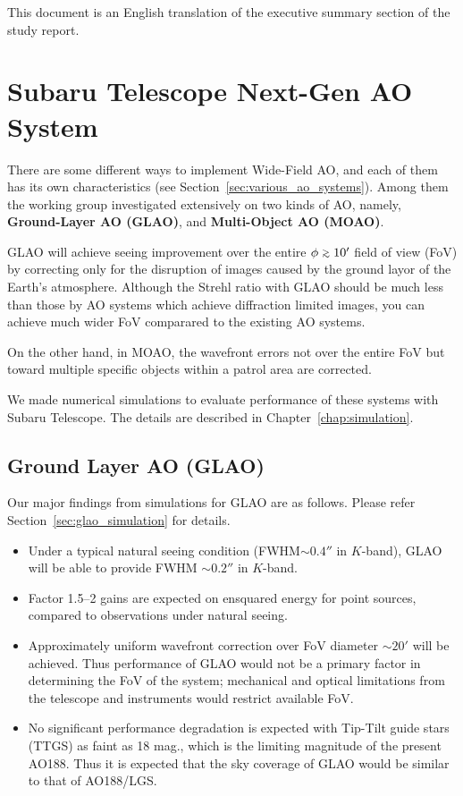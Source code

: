 This document is an English translation of the executive summary section
of the study report.

\medskip


\section{Subaru Telescope Next-Gen AO System}

There are some different ways to implement Wide-Field AO, and each of
them has its own characteristics (see
Section~\ref{sec:various_ao_systems}). Among them the working group
investigated extensively on two kinds of AO, namely,
{\bf Ground-Layer AO (GLAO)}, and {\bf Multi-Object AO (MOAO)}.

GLAO will achieve seeing improvement over the entire $\phi \gsim 10'$ field
of view (FoV) by correcting only for the disruption of images caused by the
ground layor of the Earth's atmosphere. Although the Strehl ratio with
GLAO should be much less than those by AO systems which achieve
diffraction limited images, you can achieve much wider FoV comparared to
the existing AO systems.

On the other hand, in MOAO, the wavefront errors not over the entire FoV
but toward multiple specific objects within a patrol area are
corrected. 

We made numerical simulations to evaluate performance of these systems
with Subaru Telescope. The details are described in 
Chapter~\ref{chap:simulation}.

\subsection{Ground Layer AO (GLAO)}

Our major findings from simulations for GLAO are as follows. 
Please refer Section~\ref{sec:glao_simulation} for details.

\begin{itemize}
 \setlength{\itemsep}{-3pt}
 \item Under a typical natural seeing condition (FWHM$\sim 0.4''$ in
       $K$-band), GLAO will be able to provide FWHM $\sim 0.2''$ in
       $K$-band. 
 \item Factor 1.5--2 gains are expected on ensquared energy for point
       sources, compared to observations under natural seeing.
 \item Approximately uniform wavefront correction over FoV diameter
       $\sim 20'$ will be achieved. Thus performance of GLAO would not
       be a primary factor in determining the FoV of the system;
       mechanical and optical limitations from the telescope and
       instruments would restrict available FoV.
 \item No significant performance degradation is expected with Tip-Tilt
       guide stars (TTGS) as faint as 18 mag., which is the limiting magnitude
       of the present AO188. Thus it is expected that the sky coverage
       of GLAO would be similar to that of AO188/LGS.
\end{itemize}

